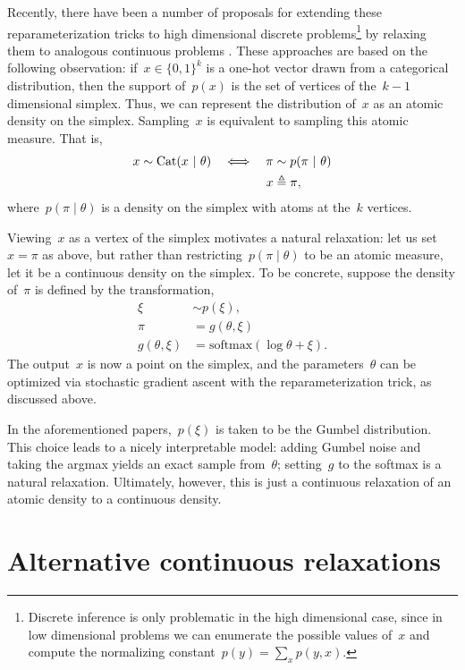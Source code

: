 \documentclass{article}
\begin{document}
Recently, there have been a number of proposals for extending these
reparameterization tricks to high dimensional discrete
problems\footnote{Discrete inference is only problematic in the high
dimensional case, since in low dimensional problems we can enumerate
the possible values of~$x$ and compute the normalizing constant~$p(y)
= \sum_x p(y, x)$.} by relaxing them to analogous continuous
problems \citep{maddison2016concrete, jang2016categorical,
kusner2016gans}.  These approaches are based on the following
observation: if~$x \in \{0,1\}^k$ is a one-hot vector drawn from a
categorical distribution, then the support of~$p(x)$ is the set of
vertices of the~$k-1$ dimensional simplex.  Thus, we can represent the
distribution of~$x$ as an atomic density on the simplex.  Sampling~$x$
is equivalent to sampling this atomic measure. That is,
\begin{align}
  x &\sim \mathrm{Cat}( x ~\vert~ \theta) &\iff& & {\pi} &\sim p({\pi} ~\vert~ \theta) \nonumber \\
  & & & & x &\triangleq {\pi},
\end{align}
where~$p({\pi} \mid \theta)$ is a density on the simplex with atoms at
the~$k$ vertices.

Viewing~$x$ as a vertex of the simplex motivates a natural relaxation:
let us set~$x={\pi}$ as above, but 
rather than restricting~$p({\pi} \mid \theta)$ to be an atomic measure,
let it be a continuous density on the simplex. To be concrete, suppose
the density of~${\pi}$ is defined by the transformation,
\begin{align}
  \xi &\sim p(\xi), \\
  {\pi} &= g(\theta, \xi) \\
  g(\theta, \xi) &= \text{softmax}(\log \theta + \xi).
\end{align}
The output~$x$ is now a point on the simplex, and the parameters~$\theta$ can
be optimized via stochastic gradient ascent with the reparameterization trick,
as discussed above.

In the aforementioned papers,~$p(\xi)$ is taken to be the Gumbel distribution.
This choice leads to a nicely interpretable model: adding
Gumbel noise and taking the argmax yields an exact sample from~$\theta$;
setting~$g$ to the softmax is a natural relaxation. Ultimately, however, this
is just a continuous relaxation of an atomic density to a continuous
density. 

\section{Alternative continuous relaxations}
\label{sec:alternative}
\end{document}
